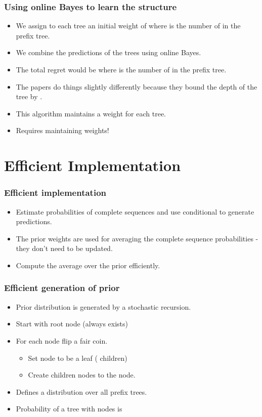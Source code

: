 \documentclass[handout]{beamer}
\begin{document}
\begin{frame}
\frametitle{Using online Bayes to learn the structure}
\begin{itemize}
\item We assign to each tree an initial weight of  where  is the number of  in the 
prefix tree.
\item We combine the predictions of the trees using online Bayes.
\item The total regret would be  where  is the number of  in the prefix tree.
\item The papers do things slightly differently because they bound the depth of the tree by .
\item This algorithm maintains a weight for each tree.
\item Requires maintaining  weights!
\end{itemize}
\end{frame}


\section{Efficient Implementation}

\begin{frame}
\frametitle{Efficient implementation}
\begin{itemize}
\item {} Estimate probabilities of complete sequences and use conditional to generate predictions.
\item The prior weights are used for averaging the complete sequence probabilities - they don't need to be updated.
\item {} Compute the average over the prior efficiently.
\end{itemize}
\end{frame}

\begin{frame}
\frametitle{Efficient generation of prior}
\begin{itemize}
\item Prior distribution is generated by a stochastic recursion.
\item Start with root node (always exists)
\item For each node flip a fair coin.
\begin{itemize}
\item {} Set node to be a leaf ( children)
\item {} Create  children nodes to the node.
\end{itemize}
\item Defines a distribution over all prefix trees.
\item Probability of a tree with  nodes is 
\end{itemize}
\end{frame}
\end{document}
